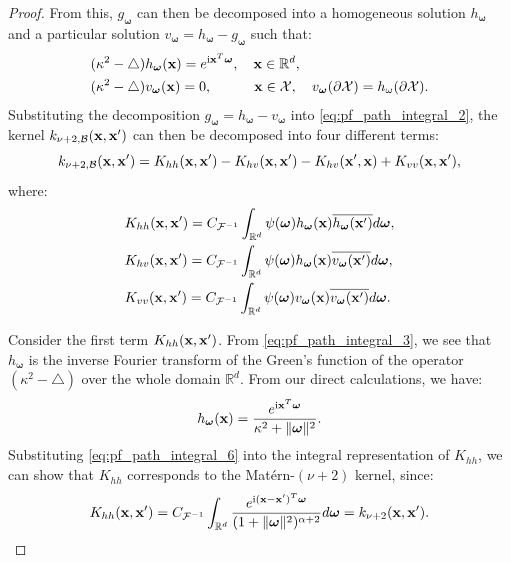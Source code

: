 \documentclass[aos,preprint]{imsart}
\theoremstyle{plain}
\newcommand{\Real}{\mathbb R}
\newcommand{\CalX}{\mathcal X}
\newcommand{\Bx}{\bold x}
\newcommand{\BFx}{\bold x}
\newcommand{\im}{\text{i}}
\newcommand{\CalF}{\mathcal{F}}
\newcommand{\Bomega}{\boldsymbol{\omega}}
\theoremstyle{remark}
\begin{document}
\begin{proof}
From this, $g_{\Bomega}$ can then be decomposed into a homogeneous solution $h_{\Bomega}$ and a particular solution $v_{\Bomega} = h_{\Bomega} - g_{\Bomega}$ such that:
\begin{align}
    &(\kappa^2-\bigtriangleup) h_{\Bomega}(\BFx)=e^{ \im \BFx^T\Bomega},\quad  \BFx\in\Real^d, \label{eq:pf_path_integral_3}\\
    &(\kappa^2-\bigtriangleup) v_{\Bomega}(\BFx)=0,\quad \quad \quad \BFx\in\CalX, \quad v_{\Bomega}(\partial\CalX)=h_\omega(\partial\CalX).\label{eq:pf_path_integral_4}
\end{align}
Substituting the decomposition $g_{\Bomega}=h_{\Bomega}-v_{\Bomega}$ into \eqref{eq:pf_path_integral_2}, the kernel $k_{\nu+2,\mathcal{B}}(\BFx,\BFx')$ can then be decomposed into four different terms:
\begin{equation}
    k_{\nu+2,\mathcal{B}}(\BFx,\BFx')=K_{hh}(\BFx,\BFx')-K_{hv}(\BFx,\BFx')-K_{hv}(\BFx',\BFx)+K_{vv}(\BFx,\BFx'),\label{eq:pf_path_integral_5}
\end{equation}
where:
\begin{align}
\begin{split}
    &K_{hh}(\BFx,\BFx')=C_{\CalF^{-1}}\int_{\Real^d}\psi(\Bomega)h_{\Bomega}(\BFx)\overline{h_{\Bomega}(\BFx')}d\Bomega,\\
    &K_{hv}(\BFx,\BFx')=C_{\CalF^{-1}}\int_{\Real^d}\psi(\Bomega)h_{\Bomega}(\BFx)\overline{v_{\Bomega}(\BFx')}d\Bomega,\\
    &K_{vv}(\BFx,\BFx')=C_{\CalF^{-1}}\int_{\Real^d}\psi(\Bomega)v_{\Bomega}(\BFx)\overline{v_{\Bomega}(\BFx')}d\Bomega.
    \label{eq:khh_int}
\end{split}
\end{align}

Consider the first term $K_{hh}(\BFx,\BFx')$. From \eqref{eq:pf_path_integral_3}, we see that $h_{\Bomega}$ is the inverse Fourier transform of the Green's function of the operator $(\kappa^2-\bigtriangleup)$ over the whole domain $\Real^d$. From our direct calculations, we have:
\begin{equation}
    h_{\Bomega}(\BFx)=\frac{e^{\im \BFx^T\Bomega}}{\kappa^2+\|\Bomega\|^2}\label{eq:pf_path_integral_6}.
\end{equation}
Substituting \eqref{eq:pf_path_integral_6} into the integral representation of $K_{hh}$, we can show that $K_{hh}$ corresponds to the Mat\'ern-$(\nu+2)$ kernel, since:
\begin{equation}
    K_{hh}(\BFx,\BFx')=C_{\CalF^{-1}}\int_{\Real^d}\frac{e^{\im(\Bx-\Bx')^T\Bomega}}{(1+\|\Bomega\|^2)^{\alpha+2}}d\Bomega=k_{\nu+2}(\BFx,\BFx'). \label{eq:pf_path_integral_7}
\end{equation}


\end{proof}
\end{document}
